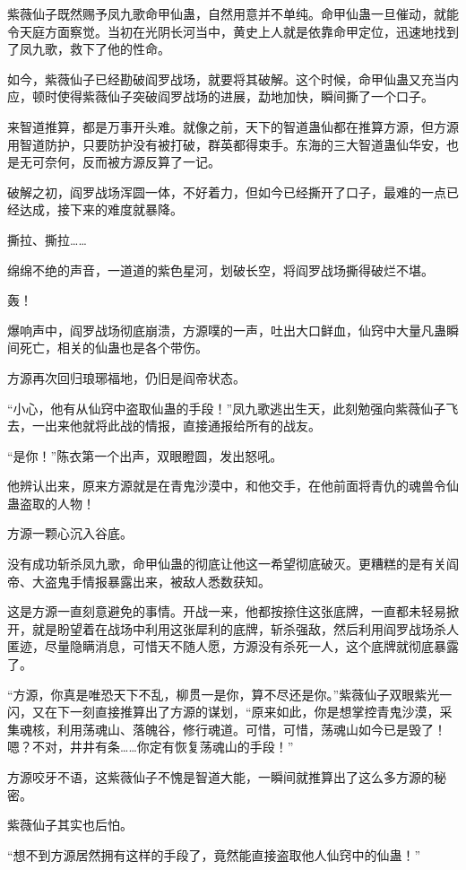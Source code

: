 \begin{this_body}
紫薇仙子既然赐予凤九歌命甲仙蛊，自然用意并不单纯。命甲仙蛊一旦催动，就能令天庭方面察觉。当初在光阴长河当中，黄史上人就是依靠命甲定位，迅速地找到了凤九歌，救下了他的性命。

如今，紫薇仙子已经勘破阎罗战场，就要将其破解。这个时候，命甲仙蛊又充当内应，顿时使得紫薇仙子突破阎罗战场的进展，勐地加快，瞬间撕了一个口子。

来智道推算，都是万事开头难。就像之前，天下的智道蛊仙都在推算方源，但方源用智道防护，只要防护没有被打破，群英都得束手。东海的三大智道蛊仙华安，也是无可奈何，反而被方源反算了一记。

破解之初，阎罗战场浑圆一体，不好着力，但如今已经撕开了口子，最难的一点已经达成，接下来的难度就暴降。

撕拉、撕拉……

绵绵不绝的声音，一道道的紫色星河，划破长空，将阎罗战场撕得破烂不堪。

轰！

爆响声中，阎罗战场彻底崩溃，方源噗的一声，吐出大口鲜血，仙窍中大量凡蛊瞬间死亡，相关的仙蛊也是各个带伤。

方源再次回归琅琊福地，仍旧是阎帝状态。

“小心，他有从仙窍中盗取仙蛊的手段！”凤九歌逃出生天，此刻勉强向紫薇仙子飞去，一出来他就将此战的情报，直接通报给所有的战友。

“是你！”陈衣第一个出声，双眼瞪圆，发出怒吼。

他辨认出来，原来方源就是在青鬼沙漠中，和他交手，在他前面将青仇的魂兽令仙蛊盗取的人物！

方源一颗心沉入谷底。

没有成功斩杀凤九歌，命甲仙蛊的彻底让他这一希望彻底破灭。更糟糕的是有关阎帝、大盗鬼手情报暴露出来，被敌人悉数获知。

这是方源一直刻意避免的事情。开战一来，他都按捺住这张底牌，一直都未轻易掀开，就是盼望着在战场中利用这张犀利的底牌，斩杀强敌，然后利用阎罗战场杀人匿迹，尽量隐瞒消息，可惜天不随人愿，方源没有杀死一人，这个底牌就彻底暴露了。

“方源，你真是唯恐天下不乱，柳贯一是你，算不尽还是你。”紫薇仙子双眼紫光一闪，又在下一刻直接推算出了方源的谋划，“原来如此，你是想掌控青鬼沙漠，采集魂核，利用荡魂山、落魄谷，修行魂道。可惜，可惜，荡魂山如今已是毁了！嗯？不对，井井有条……你定有恢复荡魂山的手段！”

方源咬牙不语，这紫薇仙子不愧是智道大能，一瞬间就推算出了这么多方源的秘密。

紫薇仙子其实也后怕。

“想不到方源居然拥有这样的手段了，竟然能直接盗取他人仙窍中的仙蛊！”


\end{this_body}
